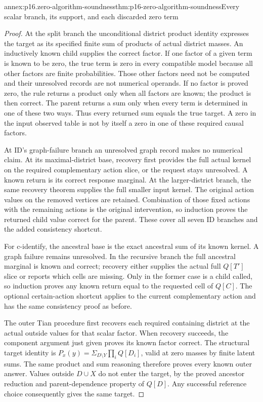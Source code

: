\begin{annexitem}{annex:p16.zero-algorithm-soundness}{thm:p16-zero-algorithm-soundness}{Every scalar branch, its support, and each discarded zero term}
\begin{proof}
At the split branch the unconditional district product identity
expresses the target as its specified finite sum of products of
actual district masses. An inductively known child supplies the
correct factor. If one factor of a given term is known to be
zero, the true term is zero in every compatible model because
all other factors are finite probabilities. Those other factors
need not be computed and their unresolved records are not numerical
operands. If no factor is proved zero, the rule returns a product
only when all factors are known; the product is then correct.
The parent returns a sum only when every term is determined in
one of these two ways. Thus every returned sum equals the true
target. A zero in the input observed table is not by itself a
zero in one of these required causal factors.

At ID's graph-failure branch an unresolved graph record makes
no numerical claim. At its maximal-district base, recovery first
provides the full actual kernel on the required complementary
action slice, or the request stays unresolved. A known return
is its correct response marginal. At the larger-district branch,
the same recovery theorem supplies the full smaller input kernel.
The original action values on the removed vertices are retained.
Combination of those fixed actions with the remaining actions
is the original intervention, so induction proves the returned
child value correct for the parent. These cover all seven ID
branches and the added consistency shortcut.

For c-identify, the ancestral base is the exact ancestral sum
of its known kernel. A graph failure remains unresolved. In the
recursive branch the full ancestral marginal is known and correct;
recovery either supplies the actual full \(Q[T']\) slice or
reports which cells are missing. Only in the former case is a
child called, so induction proves any known return equal to
the requested cell of \(Q[C]\). The optional certain-action
shortcut applies to the current complementary action and has
the same consistency proof as before.

The outer Tian procedure first recovers each required containing
district at the actual outside values for that scalar factor.
When recovery succeeds, the component argument just given proves
its known factor correct. The structural target identity is
\(P_x(y)=\Sigma_{D\setminus Y}\prod_i Q[D_i]\), valid
at zero masses by finite latent sums. The same product and sum
reasoning therefore proves every known outer answer. Values
outside \(D\cup X\) do not enter the target, by the proved
ancestor reduction and parent-dependence property of \(Q[D]\).
Any successful reference choice consequently gives the same target.


\end{proof}
\end{annexitem}

